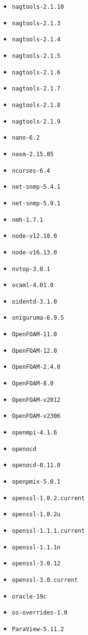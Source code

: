 \begin{multicols}{3}
\begin{itemize}
\item \verb|nagtools-2.1.10|
\item \verb|nagtools-2.1.3|
\item \verb|nagtools-2.1.4|
\item \verb|nagtools-2.1.5|
\item \verb|nagtools-2.1.6|
\item \verb|nagtools-2.1.7|
\item \verb|nagtools-2.1.8|
\item \verb|nagtools-2.1.9|
\item \verb|nano-6.2|
\item \verb|nasm-2.15.05|
\item \verb|ncurses-6.4|
\item \verb|net-snmp-5.4.1|
\item \verb|net-snmp-5.9.1|
\item \verb|nmh-1.7.1|
\item \verb|node-v12.18.0|
\item \verb|node-v16.13.0|
\item \verb|nvtop-3.0.1|
\item \verb|ocaml-4.01.0|
\item \verb|oidentd-3.1.0|
\item \verb|oniguruma-6.9.5|
\item \verb|OpenFOAM-11.0|
\item \verb|OpenFOAM-12.0|
\item \verb|OpenFOAM-2.4.0|
\item \verb|OpenFOAM-8.0|
\item \verb|OpenFOAM-v2012|
\item \verb|OpenFOAM-v2306|
\item \verb|openmpi-4.1.6|
\item \verb|openocd|
\item \verb|openocd-0.11.0|
\item \verb|openpmix-5.0.1|
\item \verb|openssl-1.0.2.current|
\item \verb|openssl-1.0.2u|
\item \verb|openssl-1.1.1.current|
\item \verb|openssl-1.1.1n|
\item \verb|openssl-3.0.12|
\item \verb|openssl-3.0.current|
\item \verb|oracle-19c|
\item \verb|os-overrides-1.0|
\item \verb|ParaView-5.11.2|

\end{itemize}
\end{multicols}
